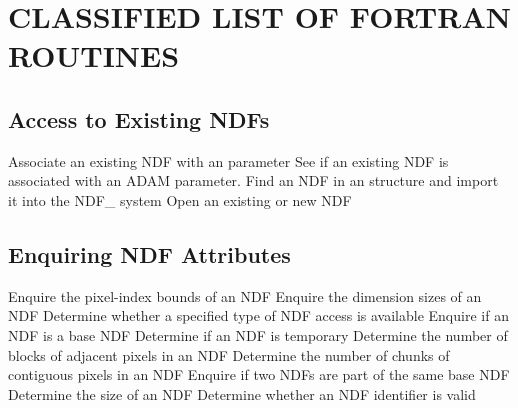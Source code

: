 \newpage
\section{CLASSIFIED LIST OF FORTRAN ROUTINES}

\subsection{Access to Existing NDFs}

            {Associate an existing NDF with an  parameter}
            {See if an existing NDF is associated with an ADAM parameter.}
            {Find an NDF in an  structure and import it into the NDF\_ system}
            {Open an existing or new NDF}

\subsection{Enquiring NDF Attributes}

            {Enquire the pixel-index bounds of an NDF}
            {Enquire the dimension sizes of an NDF}
            {Determine whether a specified type of NDF access is available}
            {Enquire if an NDF is a base NDF}
            {Determine if an NDF is temporary}
            {Determine the number of blocks of adjacent pixels in an NDF}
            {Determine the number of chunks of contiguous pixels in an NDF}
            {Enquire if two NDFs are part of the same base NDF}
            {Determine the size of an NDF}
            {Determine whether an NDF identifier is valid}

